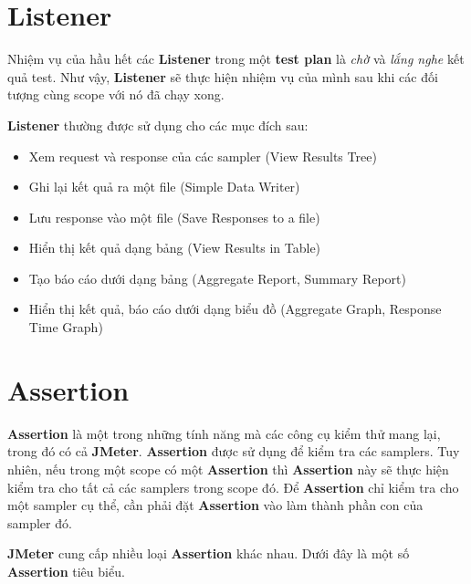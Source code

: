 \documentclass[10pt]{report}
\newcommand{\jmeter}{\textbf{JMeter}}
\begin{document}
\section{Listener}

\par Nhiệm vụ của hầu hết các \textbf{Listener} trong một \textbf{test plan} là \textit{chờ} và \textit{lắng nghe} kết quả test. Như vậy, \textbf{Listener} sẽ thực hiện nhiệm vụ của mình sau khi các đối tượng cùng scope với nó đã chạy xong.

\par \textbf{Listener} thường được sử dụng cho các mục đích sau:

\begin{itemize}
    \item Xem request và response của các sampler (View Results Tree)
    \item Ghi lại kết quả ra một file (Simple Data Writer)
    \item Lưu response vào một file (Save Responses to a file)
    \item Hiển thị kết quả dạng bảng (View Results in Table)
    \item Tạo báo cáo dưới dạng bảng (Aggregate Report, Summary Report)
    \item Hiển thị kết quả, báo cáo dưới dạng biểu đồ (Aggregate Graph, Response Time Graph)
\end{itemize}

\section{Assertion}

\par \textbf{Assertion} là một trong những tính năng mà các công cụ kiểm thử mang lại, trong đó có cả \jmeter{}. \textbf{Assertion} được sử dụng để kiểm tra các samplers. Tuy nhiên, nếu trong một scope có một \textbf{Assertion} thì \textbf{Assertion} này sẽ thực hiện kiểm tra cho tất cả các samplers trong scope đó. Để \textbf{Assertion} chỉ kiểm tra cho một sampler cụ thể, cần phải đặt \textbf{Assertion} vào làm thành phần con của sampler đó.

\par \jmeter{} cung cấp nhiều loại \textbf{Assertion} khác nhau. Dưới đây là một số \textbf{Assertion} tiêu biểu.
\end{document}
